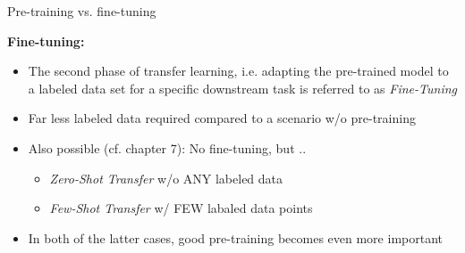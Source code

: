 
\begin{vbframe}{Pre-training vs. fine-tuning}

\vfill

\textbf{Fine-tuning:}

	\begin{itemize}
		\item The second phase of transfer learning, i.e. adapting the pre-trained model
					to a labeled data set for a specific downstream task is referred to as \textit{Fine-Tuning}
		\item Far less labeled data required compared to a scenario w/o pre-training
		\item Also possible (cf. chapter 7): No fine-tuning, but .. 
			\begin{itemize}
				\item \textit{Zero-Shot Transfer} w/o ANY labeled data
				\item \textit{Few-Shot Transfer} w/ FEW labaled data points
			\end{itemize}
		\item In both of the latter cases, good pre-training becomes even more important
	\end{itemize}
	
\vfill

\end{vbframe}


\endlecture

